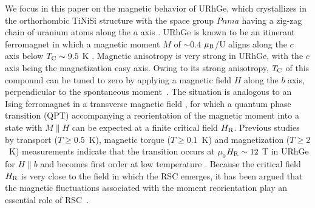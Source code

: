 \documentclass[twocolumn, aps, superscriptaddress, amsfonts,floatfix]{revtex4}%
\begin{document}
We focus in this paper on the magnetic behavior of URhGe,
 which crystallizes in the orthorhombic TiNiSi structure with the space group $Pnma$ having a zig-zag chain of uranium atoms  along the $a$ axis \cite{TRAN199881}.
URhGe is known to be an itinerant ferromagnet  in which a magnetic moment  $M$ of $\sim 0.4$ $\mu_{\rm B}$/U aligns along the $c$ axis below $T_{\rm C} \sim 9.5$ K \cite{levy2005magnetic,hardy2011transverse}.
Magnetic anisotropy is very strong in URhGe, with the $c$ axis being the magnetization easy axis.
Owing to its strong anisotropy,  $T_{\rm C}$  of this compound can be tuned to zero by applying  a magnetic field $H$ along the $b$ axis, perpendicular to the spontaneous moment~\cite{hardy2011transverse}.
The situation is analogous to an Ising ferromagnet in a transverse magnetic field \cite{PFEUTY197079}, for which a quantum phase transition (QPT) accompanying a reorientation of the magnetic moment into a state with $M \parallel H$ can be expected at a finite critical field $H_{\rm R}$. 
 Previous studies by transport ($T\ge 0.5$~K), magnetic torque ($T\ge 0.1$~K) and magnetization ($T\ge 2$~K) measurements indicate that the transition occurs at $\mu_{0}$$H_{\rm R}\sim 12$ T in URhGe for $H \parallel b$ and becomes first order at low temperature \cite{levy2009coexistence,levy2005magnetic,hardy2011transverse,aoki2014superconductivity}.
Because the critical field $H_{\rm R}$ is very close to the field in which the RSC emerges, it has been argued that the magnetic fluctuations associated with the moment reorientation play an essential role of RSC~\cite{levy2005magnetic,levy2009coexistence,tokunaga2015reentrant}. 
\end{document}
